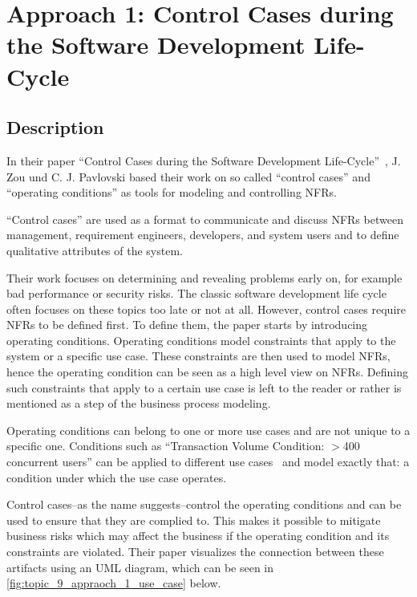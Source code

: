 \section{Approach 1: Control Cases during the Software Development Life-Cycle } \label{sec:9_approach_1}


\subsection{Description}

In their paper \enquote{Control Cases during the Software Development Life-Cycle}~\cite{ZouPavlovski2008}, J. Zou und C. J. Pavlovski based their work on so called  \enquote{control cases} and \enquote{operating conditions} as tools for modeling and controlling NFRs.

\enquote{Control cases} are used as a format to communicate and discuss NFRs between management, requirement engineers, developers, and system users and to define qualitative attributes of the system.

Their work focuses on determining and revealing problems early on, for example bad performance or security risks.
The classic software development life cycle often focuses on these topics too late or not at all.
However, control cases require NFRs to be defined first.
To define them, the paper starts by introducing operating conditions.
Operating conditions model constraints that apply to the system or a specific use case. These constraints are then used to model NFRs, hence the operating condition can be seen as a high level view on NFRs.
Defining such constraints that apply to a certain use case is left to the reader or rather is mentioned as a step of the business process modeling.

Operating conditions can belong to one or more use cases and are not unique to a specific one. Conditions such as \enquote{Transaction Volume Condition: $>$400 concurrent users} can be applied to different use cases~\cite{ZouPavlovski2008} and model exactly that: a condition under which the use case operates.

Control cases--as the name suggests--control the operating conditions and can be used to ensure that they are complied to.
This makes it possible to mitigate business risks which may affect the business if the operating condition and its constraints are violated.
Their paper visualizes the connection between these artifacts using an UML diagram, which can be seen in \autoref{fig:topic_9_appraoch_1_use_case} below.

